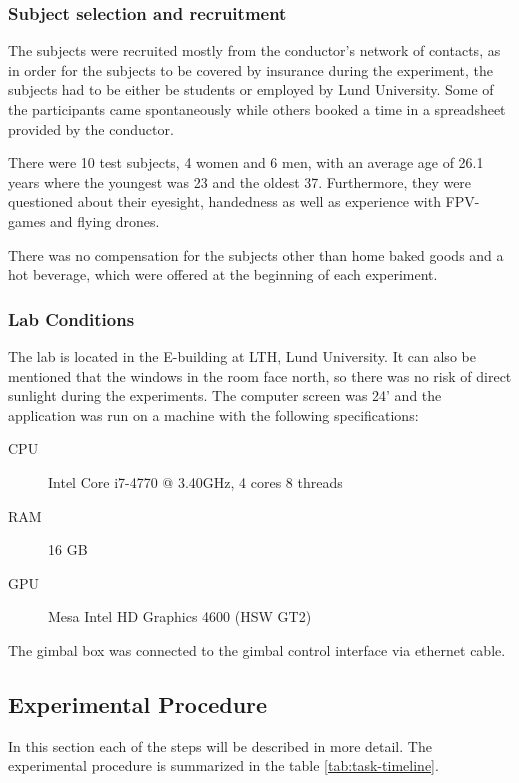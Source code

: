 \documentclass[nofilelist]{cslthse-msc}
\begin{document}
\subsubsection{Subject selection and recruitment}
The subjects were recruited mostly from the conductor's network of contacts, as in order for the subjects to be covered by insurance during the experiment, the subjects had to be either be students or employed by Lund University. Some of the participants came spontaneously while others booked a time in a spreadsheet provided by the conductor.

There were 10 test subjects, 4 women and 6 men, with an average age of 26.1 years where the youngest was 23 and the oldest 37. Furthermore, they were questioned about their eyesight, handedness as well as experience with FPV-games and flying drones.

There was no compensation for the subjects other than home baked goods and a hot beverage, which were offered at the beginning of each experiment. 

\subsubsection{Lab Conditions}
The lab is located in the E-building at LTH, Lund University. It can also be mentioned that the windows in the room face north, so there was no risk of direct sunlight during the experiments.
The computer screen was 24' and the application was run on a machine with the following specifications:
\begin{description}
   \item[CPU] Intel Core i7-4770 @ 3.40GHz, 4 cores 8 threads
   \item[RAM] 16 GB
   \item[GPU] Mesa Intel HD Graphics 4600 (HSW GT2)
\end{description}

The gimbal box was connected to the gimbal control interface via ethernet cable.

\subsection{Experimental Procedure}
In this section each of the steps will be described in more detail. The experimental procedure is summarized in the table \ref{tab:task-timeline}.
\end{document}
